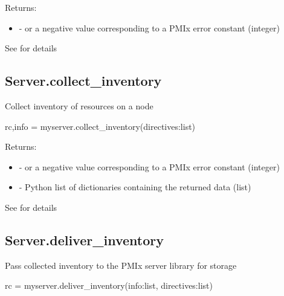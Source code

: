 Returns:

\begin{itemize}
    \item {} -  or a negative value corresponding to a PMIx error constant (integer)
\end{itemize}


See  for details


\subsection{Server.collect_inventory}

\summary
Collect inventory of resources on a node

\format

\pyspecificstart
\begin{codepar}
rc,info = myserver.collect_inventory(directives:list)
\end{codepar}
\pyspecificend


\begin{arglist}
\end{arglist}

Returns:

\begin{itemize}
    \item {} -  or a negative value corresponding to a PMIx error constant (integer)
    \item {} - Python list of  dictionaries containing the returned data (list)
\end{itemize}


See  for details


\subsection{Server.deliver_inventory}

\summary
Pass collected inventory to the \ac{PMIx} server library for storage

\format

\pyspecificstart
\begin{codepar}
rc = myserver.deliver_inventory(info:list, directives:list)
\end{codepar}
\pyspecificend


